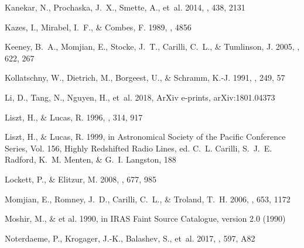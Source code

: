 \documentclass[iop,apjl,numberedappendix,appendixfloats,twocolappendix,revtex4]{emulateapj}
\begin{document}
\begin{thebibliography}{}
{Kanekar}, N., {Prochaska}, J.~X., {Smette}, A., {et~al.} 2014, \mnras, 438,
  2131

{Kazes}, I., {Mirabel}, I.~F., \& {Combes}, F. 1989, \iaucirc, 4856

{Keeney}, B.~A., {Momjian}, E., {Stocke}, J.~T., {Carilli}, C.~L., \&
  {Tumlinson}, J. 2005, \apj, 622, 267

{Kollatschny}, W., {Dietrich}, M., {Borgeest}, U., \& {Schramm}, K.-J. 1991,
  \aap, 249, 57

{Li}, D., {Tang}, N., {Nguyen}, H., {et~al.} 2018, ArXiv e-prints,
  arXiv:1801.04373

{Liszt}, H., \& {Lucas}, R. 1996, \aap, 314, 917

{Liszt}, H., \& {Lucas}, R. 1999, in Astronomical Society of the Pacific
  Conference Series, Vol. 156, Highly Redshifted Radio Lines, ed. C.~L.
  {Carilli}, S.~J.~E. {Radford}, K.~M. {Menten}, \& G.~I. {Langston}, 188

{Lockett}, P., \& {Elitzur}, M. 2008, \apj, 677, 985

{Momjian}, E., {Romney}, J.~D., {Carilli}, C.~L., \& {Troland}, T.~H. 2006,
  \apj, 653, 1172

{Moshir}, M., \& {et al.} 1990, in IRAS Faint Source Catalogue, version 2.0
  (1990)

{Noterdaeme}, P., {Krogager}, J.-K., {Balashev}, S., {et~al.} 2017, \aap, 597,
  A82


\end{thebibliography}
\end{document}
